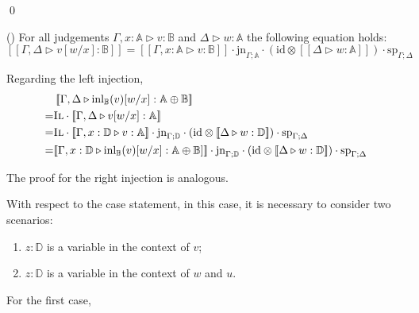 \qed

\hspace{10pt}

\begin{lemma} \label{interpret_subs} () For all judgements  $\Gamma,x:\mathbb{A} \triangleright v: \mathbb{B}$ and $\Delta \triangleright w: \mathbb{A}$  the following equation holds: 
  $[\![\Gamma, \Delta \triangleright v[w/x]: \mathbb{B}]\!] = [\![\Gamma, x:\mathbb{A} \triangleright v: \mathbb{B}]\!]\cdot \text{jn}_{\Gamma;\mathbb{A}} \cdot (\text{id} \otimes [\![ \Delta  \triangleright w: \mathbb{A}]\!] ) \cdot \text{sp}_{\Gamma;\Delta}$ 
\end{lemma}

Regarding the left injection,
\begin{equation*}
  \begin{split}
    & \hspace{2pt} [\![\Gamma,  \Delta \triangleright \text{inl}_{\mathbb{B}}(v) [w/x]:  \mathbb{A} \oplus \mathbb{B}]\!] \\
    = & \textsc{Il} \cdot [\![\Gamma, \Delta  \triangleright v [w/x]: \mathbb{A}]\!]   \\
    = & \textsc{Il} \cdot [\![\Gamma, x: \mathbb{D}  \triangleright v: \mathbb{A}]\!] \cdot \text{jn}_{\Gamma;\mathbb{D}} \cdot (\text{id} \otimes [\![ \Delta \triangleright w:\mathbb{D}  ]\!]) \cdot \text{sp}_{\Gamma;\Delta}   \\
    = & [\![ \Gamma, x: \mathbb{D}  \triangleright \text{inl}_{\mathbb{B}}(v) [w/x]:  \mathbb{A} \oplus \mathbb{B}] ]\!] \cdot \text{jn}_{\Gamma;\mathbb{D}} \cdot (\text{id} \otimes [\![ \Delta \triangleright w:\mathbb{D}  ]\!]) \cdot \text{sp}_{\Gamma;\Delta}
  \end{split}
\end{equation*}

The proof for the right injection is analogous.


With respect to the case statement, in this case, it is necessary to consider two scenarios:
  \begin{enumerate}
    \item $z:\mathbb{D}$ is a variable in the context of $v$;
    \item $z:\mathbb{D}$ is a variable in the context of $w$ and $u$.
  \end{enumerate}

  For the first case,

  \vspace{10pt}

